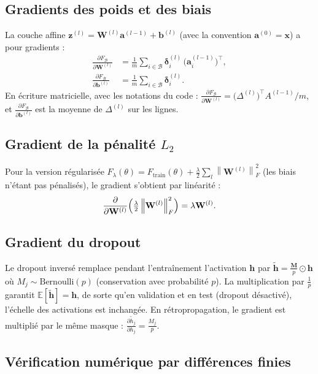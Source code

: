 \documentclass[11pt,a4paper]{article}
\newcommand{\E}{\mathbb{E}}
\newcommand{\pfrac}[2]{\frac{\partial #1}{\partial #2}}
\newcommand{\norm}[1]{\left\lVert #1 \right\rVert}
\newcommand{\vect}[1]{\mathbf{#1}}
\begin{document}
\subsection{Gradients des poids et des biais}

La couche affine $\vect{z}^{(l)} = \vect{W}^{(l)} \vect{a}^{(l-1)} + \vect{b}^{(l)}$ (avec la convention $\vect{a}^{(0)} = \vect{x}$) a pour gradients :
\begin{align}
\pfrac{F_{\mathcal{B}}}{\vect{W}^{(l)}} &= \frac{1}{m} \sum_{i \in \mathcal{B}} \vect{\delta}_i^{(l)} \, \bigl(\vect{a}_i^{(l-1)}\bigr)^\top, \label{eq:gradW}\\
\pfrac{F_{\mathcal{B}}}{\vect{b}^{(l)}} &= \frac{1}{m} \sum_{i \in \mathcal{B}} \vect{\delta}_i^{(l)} . \label{eq:gradb}
\end{align}
En écriture matricielle, avec les notations du code : $\pfrac{F_{\mathcal{B}}}{\vect{W}^{(l)}} = \bigl(\Delta^{(l)}\bigr)^\top A^{(l-1)} / m$, et $\pfrac{F_{\mathcal{B}}}{\vect{b}^{(l)}}$ est la moyenne de $\Delta^{(l)}$ sur les lignes.

\subsection{Gradient de la pénalité $L_2$}

Pour la version régularisée $F_\lambda(\theta) = F_{\mathrm{train}}(\theta) + \frac{\lambda}{2} \sum_{l} \norm{\vect{W}^{(l)}}_F^2$ (les biais n'étant pas pénalisés), le gradient s'obtient par linéarité :
\[
\pfrac{}{\vect{W}^{(l)}} \Bigl( \tfrac{\lambda}{2} \norm{\vect{W}^{(l)}}_F^2 \Bigr) = \lambda \vect{W}^{(l)}.
\]

\subsection{Gradient du dropout}

Le dropout inversé remplace pendant l'entraînement l'activation $\vect{h}$ par $\tilde{\vect{h}} = \frac{\vect{M}}{p} \odot \vect{h}$ où $M_j \sim \mathrm{Bernoulli}(p)$ (conservation avec probabilité $p$). La multiplication par $\frac{1}{p}$ garantit $\E[\tilde{\vect{h}}] = \vect{h}$, de sorte qu'en validation et en test (dropout désactivé), l'échelle des activations est inchangée. En rétropropagation, le gradient est multiplié par le même masque : $\frac{\partial \tilde h_j}{\partial h_j} = \frac{M_j}{p}$.

\subsection{Vérification numérique par différences finies}
\end{document}
